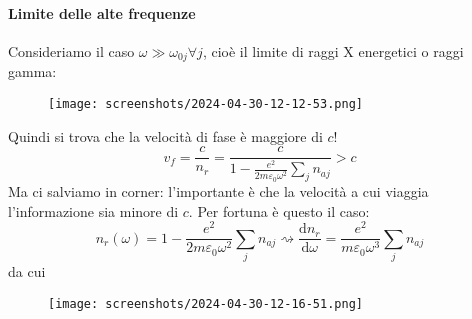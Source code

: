 \paragraph{Limite delle alte frequenze}
Consideriamo il caso \(\omega \gg \omega _{0j} \forall j\), cioè il limite di raggi X energetici o raggi gamma:
\begin{figure}[H]
	\centering
	\texttt{[image: screenshots/2024-04-30-12-12-53.png]}
\end{figure}
Quindi si trova che la velocità di fase è maggiore di \(c\)!
\begin{equation}
	v_f = \frac{c}{n_r} = \frac{c}{1- \frac{e^{2} }{2m \varepsilon _0 \omega ^{2} }\sum_{j}n_{aj} } > c
\end{equation}
Ma ci salviamo in corner: l'importante è che la velocità a cui viaggia l'informazione sia minore di \(c\). Per fortuna è questo il caso:
\begin{equation}
	n_r(\omega )=1- \frac{e^{2} }{2 m \varepsilon _0 \omega ^{2} }\sum_{j} n_{aj} \rightsquigarrow \frac{\mathrm{d}n_r}{\mathrm{d}\omega } = \frac{e ^{2} }{m \varepsilon _0 \omega ^{3}} \sum_{j}n_{aj}    
\end{equation}
da cui
\begin{figure}[H]
	\centering
	\texttt{[image: screenshots/2024-04-30-12-16-51.png]}
\end{figure}

